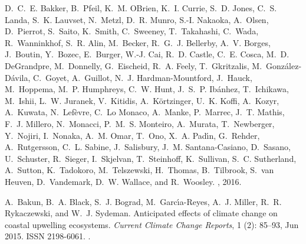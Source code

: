 \documentclass[hvmath, online,bgd]{copernicus_discussions}
\begin{document}
\begin{thebibliography}{84}
	D.~C.~E. {Bakker}, B.~{Pfeil}, K.~M. {O{\textquotesingle}Brien}, K.~I.
	{Currie}, S.~D. {Jones}, C.~S. {Landa}, S.~K. {Lauvset}, N.~{Metzl}, D.~R.
	{Munro}, S.-I. {Nakaoka}, A.~{Olsen}, D.~{Pierrot}, S.~{Saito}, K.~{Smith},
	C.~{Sweeney}, T.~{Takahashi}, C.~{Wada}, R.~{Wanninkhof}, S.~R. {Alin},
	M.~{Becker}, R.~G.~J. {Bellerby}, A.~V. {Borges}, J.~{Boutin}, Y.~{Bozec},
	E.~{Burger}, W.-J. {Cai}, R.~D. {Castle}, C.~E. {Cosca}, M.~D. {DeGrandpre},
	M.~{Donnelly}, G.~{Eischeid}, R.~A. {Feely}, T.~{Gkritzalis},
	M.~{Gonz\'{a}lez-D\'{a}vila}, C.~{Goyet}, A.~{Guillot}, N.~J.
	{Hardman-Mountford}, J.~{Hauck}, M.~{Hoppema}, M.~P. {Humphreys}, C.~W.
	{Hunt}, J.~S.~P. {Ib\'{a}nhez}, T.~{Ichikawa}, M.~{Ishii}, L.~W. {Juranek},
	V.~{Kitidis}, A.~{K\"{o}rtzinger}, U.~K. {Koffi}, A.~{Kozyr}, A.~{Kuwata},
	N.~{Lef\`{e}vre}, C.~{Lo Monaco}, A.~{Manke}, P.~{Marrec}, J.~T. {Mathis},
	F.~J. {Millero}, N.~{Monacci}, P.~M.~S. {Monteiro}, A.~{Murata},
	T.~{Newberger}, Y.~{Nojiri}, I.~{Nonaka}, A.~M. {Omar}, T.~{Ono}, X.~A.
	{Pad\'{\i}n}, G.~{Rehder}, A.~{Rutgersson}, C.~L. {Sabine}, J.~{Salisbury},
	J.~M. {Santana-Casiano}, D.~{Sasano}, U.~{Schuster}, R.~{Sieger},
	I.~{Skjelvan}, T.~{Steinhoff}, K.~{Sullivan}, S.~C. {Sutherland},
	A.~{Sutton}, K.~{Tadokoro}, M.~{Telszewski}, H.~{Thomas}, B.~{Tilbrook},
	S.~{van Heuven}, D.~{Vandemark}, D.~W. {Wallace}, and R.~{Woosley}.
	, 2016.
	
	A.~Bakun, B.~A. Black, S.~J. Bograd, M.~Garc{\'\i}a-Reyes, A.~J. Miller, R.~R.
	Rykaczewski, and W.~J. Sydeman.
	\newblock Anticipated effects of climate change on coastal upwelling
	ecosystems.
	\newblock \emph{Current Climate Change Reports}, 1 (2):
	85--93, Jun 2015.
	\newblock ISSN 2198-6061.
	\newblock {}.
	

\end{thebibliography}
\end{document}
